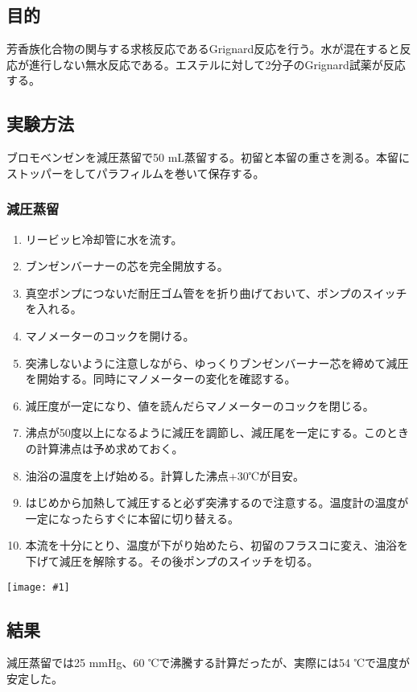 \documentclass[a4paper,papersize,dvipdfmx]{jsarticle}
\newcommand{\pict}[2]{\begin{center} \texttt{[image: \#1]} \end{center}}   %
\begin{document}
\subsection*{目的}
芳香族化合物の関与する求核反応であるGrignard反応を行う。水が混在すると反応が進行しない無水反応である。エステルに対して2分子のGrignard試薬が反応する。



\subsection*{実験方法}

ブロモベンゼンを減圧蒸留で50 mL蒸留する。初留と本留の重さを測る。本留にストッパーをしてパラフィルムを巻いて保存する。

\subsubsection*{減圧蒸留}

\begin{enumerate}
\item リービッヒ冷却管に水を流す。
\item ブンゼンバーナーの芯を完全開放する。
\item 真空ポンプにつないだ耐圧ゴム管をを折り曲げておいて、ポンプのスイッチを入れる。
\item マノメーターのコックを開ける。
\item 突沸しないように注意しながら、ゆっくりブンゼンバーナー芯を締めて減圧を開始する。同時にマノメーターの変化を確認する。
\item 減圧度が一定になり、値を読んだらマノメーターのコックを閉じる。
\item 沸点が50度以上になるように減圧を調節し、減圧尾を一定にする。このときの計算沸点は予め求めておく。
\item 油浴の温度を上げ始める。計算した沸点+30℃が目安。
\item はじめから加熱して減圧すると必ず突沸するので注意する。温度計の温度が一定になったらすぐに本留に切り替える。
\item 本流を十分にとり、温度が下がり始めたら、初留のフラスコに変え、油浴を下げて減圧を解除する。その後ポンプのスイッチを切る。


\end{enumerate}

\pict{imgs/4-zu.jpeg}{12}
\subsection*{結果}
減圧蒸留では25 mmHg、60 ℃で沸騰する計算だったが、実際には54 ℃で温度が安定した。
\end{document}
